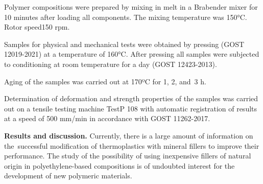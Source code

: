 
Polymer compositions were prepared by mixing in melt in a Brabender
mixer for 10 minutes after loading all components. The mixing
temperature was 150°C. Rotor speed150 rpm.

Samples for physical and mechanical tests were obtained by pressing
(GOST 12019-2021) at a temperature of 160°C. After pressing all samples
were subjected to conditioning at room temperature for a day (GOST
12423-2013).

Aging of the samples was carried out at 170ºC for 1, 2, and~3 h.

Determination of deformation and strength properties of the samples was
carried out on a tensile testing machine TestP 108 with automatic
registration of results at a speed of 500 mm/min in accordance with GOST
11262-2017.

{\bfseries Results and discussion.} Currently, there is a large amount of
information on the~successful modification of thermoplastics with
mineral fillers to improve their performance. The study of the
possibility of using inexpensive fillers of natural origin in
polyethylene-based compositions is of undoubted interest for the
development of new polymeric materials.

